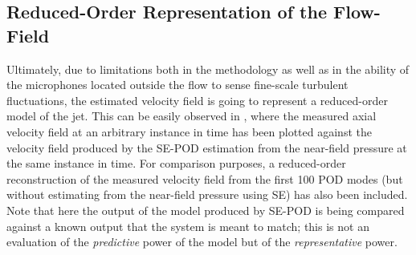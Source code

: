 \subsection{Reduced-Order Representation of the Flow-Field}
Ultimately, due to limitations both in the methodology as well as in the ability of the microphones located outside the flow to sense fine-scale turbulent fluctuations, the estimated velocity field is going to represent a reduced-order model of the jet.
This can be easily observed in , where the measured axial velocity field at an arbitrary instance in time has been plotted against the velocity field produced by the SE-POD estimation from the near-field pressure at the same instance in time.
For comparison purposes, a reduced-order reconstruction of the measured velocity field from the first 100 POD modes (but without estimating from the near-field pressure using SE) has also been included.
Note that here the output of the model produced by SE-POD is being compared against a known output that the system is meant to match; this is not an evaluation of the \textit{predictive} power of the model but of the \textit{representative} power.
